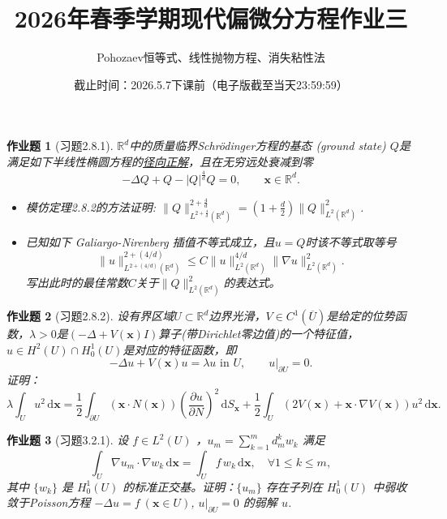 \documentclass[UTF8,fontset=windows,12pt]{ctexart}
\theoremstyle{kaiti-theorem}
\newtheorem{problem}{作业题}
\numberwithin{equation}{section}
\newcommand{\R}{\mathbb{R}}
\newcommand{\bds}[1]{\boldsymbol{#1}}  %
\newcommand{\ub}{{\overline{U}}}
\newcommand{\q}{\quad}
\newcommand{\p}{\partial}
\newcommand{\lap}{\Delta}
\newcommand{\nab}{\nabla}
\newcommand{\dxx}{\,\mathrm{d}\bds{x}}
\newcommand{\dS}{\,\mathrm{d}S}
\newcommand{\lam}{\lambda}
\newcommand{\iu}{\int_{U}}
\newcommand{\ipu}{\int_{\partial U}}
\newcommand{\xx}{{\bds{x}}}
\begin{document}
\title{\LARGE{\bf  2026年春季学期现代偏微分方程作业三}}
\author{Pohozaev恒等式、线性抛物方程、消失粘性法}
\date{截止时间：2026.5.7下课前（电子版截至当天23:59:59）}

\maketitle



\begin{problem}[习题2.8.1]
$\R^d$中的质量临界Schr\"odinger方程的基态 (ground state) $Q$是满足如下半线性椭圆方程的\underline{径向正解}，且在无穷远处衰减到零
\[
-\lap Q + Q - |Q|^{\frac{4}{d}}Q =0 ,\q\q \xx\in\R^d.
\]
\begin{itemize}
	\item [(1)] 模仿定理2.8.2的方法证明: $\|Q\|_{L^{2+\frac{4}{d}}(\R^d)}^{2+\frac{4}{d}}=(1+\frac{d}{2})\|Q\|_{L^2(\R^d)}^2$.
	\item [(2)] 已知如下 Galiargo-Nirenberg 插值不等式成立，且$u=Q$时该不等式取等号
	\[
	\|u\|_{L^{2+(4/d)}(\R^d)}^{2+(4/d)}\leqslant C\|u\|_{L^2(\R^d)}^{4/d}\|\nabla u\|_{L^2(\R^d)}^2.
	\]写出此时的最佳常数$C$关于$\|Q\|_{L^2(\R^d)}^2$的表达式。
\end{itemize}
\end{problem}

\begin{problem}[习题2.8.2]  设有界区域$U\subset\R^d$边界光滑，$V\in C^1(\ub)$是给定的位势函数，$\lam>0$是$(-\lap+V(\xx)I)$算子(带Dirichlet零边值)的一个特征值，$u\in H^2(U)\cap H_0^1(U)$是对应的特征函数，即
\[
-\lap u +V(\xx) u= \lam u\text{ in }U,\q\q u|_{\p U}=0.
\]证明：
\[
\lam\iu u^2\dxx=\frac12\ipu (\xx\cdot N(\xx))\left(\frac{\p u}{\p N}\right)^2\dS_\xx +\frac12 \iu (2V(\xx)+\xx\cdot\nab V(\xx))u^2\dxx.
\]
\end{problem}



%

\begin{problem}[习题3.2.1]
设 $f\in L^2(U)$ ，$u_m=\sum\limits_{k=1}^md_m^k w_k$ 满足 
\[
\int_U\nab u_m\cdot\nab w_k\dxx=\int_U f\, w_k\dxx,\quad \forall 1\leqslant k\leqslant m,
\] 其中 $\{w_k\}$ 是 $H_0^1(U)$ 的标准正交基。证明：$\{u_m\}$ 存在子列在 $H_0^1(U)$ 中弱收敛于Poisson方程 $-\lap u=f ~(\xx\in U)$, $u|_{\p U}=0$ 的弱解 $u$.
\end{problem}
\end{document}

